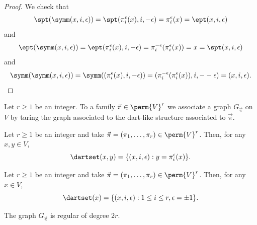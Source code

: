 \begin{proof}
  We check that
  \begin{equation*}
    \spt(\symm(x,i,\epsilon))
    = \spt(\pi_i^\epsilon(x),i,-\epsilon)
    = \pi_i^\epsilon(x)
    = \ept(x,i,\epsilon)
  \end{equation*}
  and
  \begin{equation*}
    \ept(\symm(x,i,\epsilon))
    = \ept(\pi_i^\epsilon(x),i,-\epsilon)
    = \pi_i^{-\epsilon}(\pi_i^\epsilon(x))
    = x = \spt(x,i,\epsilon)
  \end{equation*}
  and
  \begin{equation*}
    \symm(\symm(x,i,\epsilon))
    = \symm((\pi_i^\epsilon(x),i,-\epsilon))
    = (\pi_i^{-\epsilon}(\pi_i^\epsilon(x)),i,--\epsilon)
    = (x,i,\epsilon).
  \end{equation*}
\end{proof}

\begin{definition}
  \label{def:graph_of_pi}
   Let $r \geq 1$ be an integer. To a family $\vec{\pi} \in \perm{V}^r$
  we associate a graph $G_{\vec{\pi}}$ on $V$ by taring the graph associated to the dart-like
  structure associated to $\vec{\pi}$.
\end{definition}

\begin{lemma}
  \label{lem:dartset_pair_pi}
  Let $r \geq 1$ be an integer and take $\vec{\pi} = (\pi_1, \ldots, \pi_r) \in \perm{V}^r$.
  Then, for any $x, y \in V$,
  \begin{equation*}
    \dartset(x,y) = \{(x,i,\epsilon): y = \pi_i^\epsilon(x)\}.
  \end{equation*}
\end{lemma}

\begin{lemma}
  \label{lem:dartset_pi}
  Let $r \geq 1$ be an integer and take $\vec{\pi} = (\pi_1, \ldots, \pi_r) \in \perm{V}^r$.
  Then, for any $x \in V$,
  \begin{equation*}
    \dartset(x) = \{(x,i,\epsilon): 1 \leq i \leq r, \epsilon = \pm 1\}.
  \end{equation*}
\end{lemma}

\begin{lemma}
  \label{lem:graph_pi_regular}
  The graph $G_{\vec{\pi}}$ is regular of degree $2r$.
\end{lemma}

